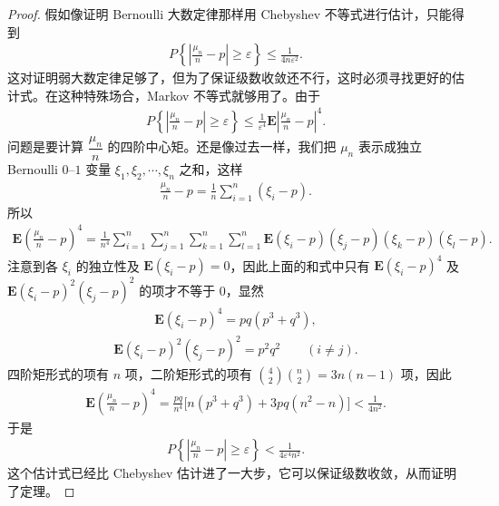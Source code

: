\documentclass[../../main.tex]{subfiles}
\begin{document}
\begin{proof}
假如像证明 Bernoulli 大数定律那样用 Chebyshev 不等式进行估计，只能得到
\begin{align}
P\!\left\{\left|\frac{\mu_n}{n}-p\right|\geqslant\varepsilon\right\}\leqslant\frac{1}{4n\varepsilon^{2}}.
\end{align}
这对证明弱大数定律足够了，但为了保证级数收敛还不行，这时必须寻找更好的估计式。在这种特殊场合，Markov 不等式就够用了。由于
\begin{align}
P\!\left\{\left|\frac{\mu_n}{n}-p\right|\geqslant\varepsilon\right\}\leqslant\frac{1}{\varepsilon^{4}}\boldsymbol{E}\left|\frac{\mu_n}{n}-p\right|^{4}.
\end{align}
问题是要计算 $\dfrac{\mu_n}{n}$ 的四阶中心矩。还是像过去一样，我们把 $\mu_n$ 表示成独立 Bernoulli $0$--$1$ 变量 $\xi_1,\xi_2,\cdots,\xi_n$ 之和，这样
\begin{align*}
\frac{\mu_n}{n}-p=\frac1n\sum_{i=1}^{n}(\xi_i-p).
\end{align*}
所以
\begin{align*}
\boldsymbol{E}\!\left(\frac{\mu_n}{n}-p\right)^{4}
=\frac{1}{n^{4}}\sum_{i=1}^{n}\sum_{j=1}^{n}\sum_{k=1}^{n}\sum_{l=1}^{n}\boldsymbol{E}(\xi_i-p)(\xi_j-p)(\xi_k-p)(\xi_l-p).
\end{align*}
注意到各 $\xi_i$ 的独立性及 $\boldsymbol{E}(\xi_i-p)=0$，因此上面的和式中只有 $\boldsymbol{E}(\xi_i-p)^{4}$ 及 $\boldsymbol{E}(\xi_i-p)^{2}(\xi_j-p)^{2}$ 的项才不等于 $0$，显然
\begin{align}
\boldsymbol{E}(\xi_i-p)^{4}=pq(p^{3}+q^{3}),
\end{align}
\begin{align}
\boldsymbol{E}(\xi_i-p)^{2}(\xi_j-p)^{2}=p^{2}q^{2}\qquad(i\neq j).
\end{align}
四阶矩形式的项有 $n$ 项，二阶矩形式的项有 $\binom{4}{2}\binom{n}{2}=3n(n-1)$ 项，因此
\begin{align}
\boldsymbol{E}\!\left(\frac{\mu_n}{n}-p\right)^{4}
=\frac{pq}{n^{4}}\bigl[n(p^{3}+q^{3})+3pq(n^{2}-n)\bigr]<\frac{1}{4n^{2}}.
\end{align}
于是
\begin{align}
P\!\left\{\left|\frac{\mu_n}{n}-p\right|\geqslant\varepsilon\right\}<\frac{1}{4\varepsilon^{4}n^{2}}.
\end{align}
这个估计式已经比 Chebyshev 估计进了一大步，它可以保证级数收敛，从而证明了定理。
\end{proof}
\end{document}
